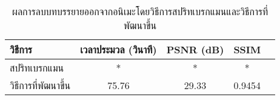 \begin{table}[H]
	\centering
	\begin{tabular}[ht]{|l|c|c|c|c|}
		\hline
		วิธีการ  & เวลาประมวล  (วินาที) & PSNR (dB) & SSIM \\
		\hline
		สปริทเบรกแมน & * & * & * \\
		วิธีการที่พัฒนาขึ้น & 75.76 & 29.33 & 0.9454 \\
		\hline
	\end{tabular}
	\caption{ผลการลบบทบรรยายออกจากอนิเมะโดยวิธีการสปริทเบรกแมนและวิธีการที่พัฒนาขึ้น}
\end{table}	
